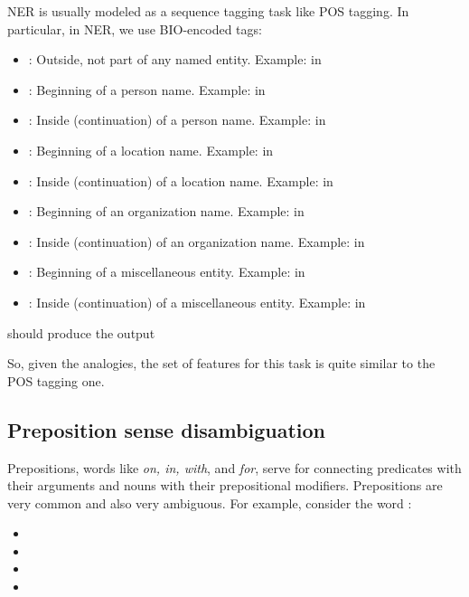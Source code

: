 NER is usually modeled as a sequence tagging task like POS tagging. In particular, in NER, we use BIO-encoded tags: 
\begin{itemize}
    \item {}: Outside, not part of any named entity. Example:  in 
    \item {}: Beginning of a person name. Example:  in 
    \item {}: Inside (continuation) of a person name. Example:  in 
    \item {}: Beginning of a location name. Example:  in 
    \item {}: Inside (continuation) of a location name. Example:  in 
    \item {}: Beginning of an organization name. Example:  in 
    \item {}: Inside (continuation) of an organization name. Example:  in 
    \item {}: Beginning of a miscellaneous entity. Example:  in 
    \item {}: Inside (continuation) of a miscellaneous entity. Example:  in 
\end{itemize}

\begin{example}{}
     should produce the output 
\end{example}

So, given the analogies, the set of features for this task is quite similar to the POS tagging one.

\subsection{Preposition sense disambiguation}
Prepositions, words like \textit{on, in, with}, and \textit{for}, serve for connecting predicates with their arguments and nouns with their prepositional modifiers. Prepositions are very common and also very ambiguous. For example, consider the word : 
\begin{itemize}
    \item[a)] 
    \item[b)] 
    \item[c)] 
    \item[d)] 
\end{itemize}


